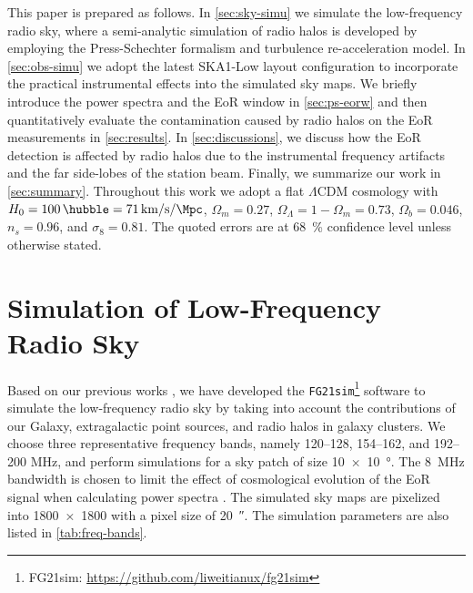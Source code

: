 \documentclass[modern]{aastex62}
\newcommand{\lcdm}{$\Lambda$CDM}
\newcommand{\editone}[1]{{\leavevmode\color{cyan}#1}}
\begin{document}
This paper is prepared as follows.
In \autoref{sec:sky-simu} we simulate the low-frequency radio sky, where a
\editone{semi-analytic} simulation of radio halos is developed by employing
the Press-Schechter formalism and turbulence re-acceleration model.
In \autoref{sec:obs-simu} we adopt the latest SKA1-Low layout
configuration to incorporate the practical instrumental effects into
the simulated sky maps.
We briefly introduce the power spectra and the EoR window in
\autoref{sec:ps-eorw}
and then quantitatively evaluate the contamination caused by radio halos
on the EoR measurements in \autoref{sec:results}.
In \autoref{sec:discussions}, we discuss how the EoR detection is
affected by radio halos due to the instrumental frequency artifacts
and the far side-lobes of the station beam.
Finally, we summarize our work in \autoref{sec:summary}.
Throughout this work we adopt a flat \lcdm{} cosmology with
$H_0 = \SI{100}{\hubble} = \SI{71}{\km\per\second\per\Mpc}$,
$\Omega_m = 0.27$, $\Omega_{\Lambda} = 1 - \Omega_m = 0.73$,
$\Omega_b = 0.046$, $n_s = 0.96$, and $\sigma_8 = 0.81$.
The quoted errors are at \SI{68}{\percent} confidence level unless
otherwise stated.


\section{Simulation of Low-Frequency Radio Sky}
\label{sec:sky-simu}

Based on our previous works \citep{wang2010,wang2013}, we have developed
the \texttt{FG21sim}\footnote{%
  FG21sim: \url{https://github.com/liweitianux/fg21sim}}
software to simulate the low-frequency
radio sky by taking into account the contributions of our Galaxy,
extragalactic point sources, and radio halos in galaxy clusters.
We choose three representative frequency bands, namely
\numrange{120}{128}, \numrange{154}{162}, and \numrange{192}{200}
\si{\MHz}, and perform simulations for a sky patch of size
\SI[product-units=repeat]{10 x 10}{\degree}.
The \SI{8}{\MHz} bandwidth is chosen to limit the effect of
cosmological evolution of the EoR signal when calculating power
spectra \citep[e.g.][]{wyithe2004,thyagarajan2013}.
The simulated sky maps are pixelized into \num{1800 x 1800} with a pixel
size of \SI{20}{\arcsecond}.
The simulation parameters are also listed in \autoref{tab:freq-bands}.
\end{document}
